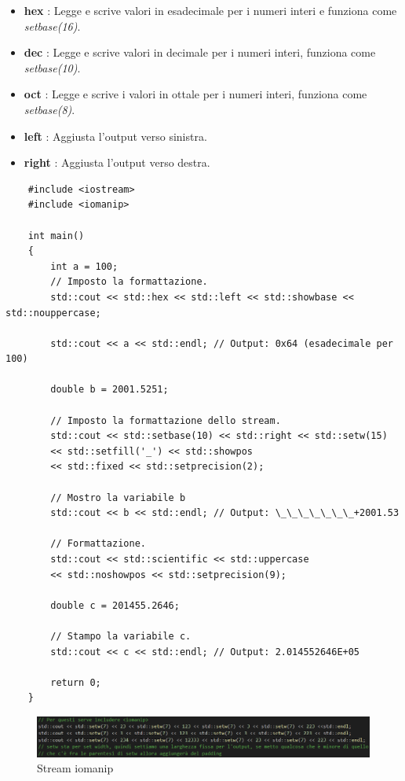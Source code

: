 \begin{enumerate}
\begin{itemize}
			\item \textsf{\small \textbf{hex} : Legge e scrive valori in esadecimale per i numeri interi e funziona come \emph{setbase(16)}.}
			\item \textsf{\small \textbf{dec} : Legge e scrive valori in decimale per i numeri interi, funziona come \emph{setbase(10)}.}
			\item \textsf{\small \textbf{oct} : Legge e scrive i valori in ottale per i numeri interi, funziona come \emph{setbase(8)}.}
			\item \textsf{\small \textbf{left} : Aggiusta l'output verso sinistra.}
			\item \textsf{\small \textbf{right} : Aggiusta l'output verso destra.}
		\end{itemize}
\end{enumerate}

\begin{lstlisting}
	#include <iostream>
	#include <iomanip>
	
	int main()
	{
		int a = 100;
		// Imposto la formattazione.
		std::cout << std::hex << std::left << std::showbase << std::nouppercase;
		
		std::cout << a << std::endl; // Output: 0x64 (esadecimale per 100)
		
		double b = 2001.5251;
		
		// Imposto la formattazione dello stream.
		std::cout << std::setbase(10) << std::right << std::setw(15)
		<< std::setfill('_') << std::showpos
		<< std::fixed << std::setprecision(2);
		
		// Mostro la variabile b
		std::cout << b << std::endl; // Output: \_\_\_\_\_\_\_+2001.53
		
		// Formattazione.
		std::cout << std::scientific << std::uppercase
		<< std::noshowpos << std::setprecision(9);
		
		double c = 201455.2646;
		
		// Stampo la variabile c.
		std::cout << c << std::endl; // Output: 2.014552646E+05
		
		return 0;
	}
\end{lstlisting}

\begin{figure}[ht]
	\centering
	\includegraphics[width=1\textwidth, height=1\textheight, keepaspectratio]{./imgs/Stream_iomanip_setw.png}
	\caption{Stream iomanip}
	\label{fig:Stream_iomanip_setw}
\end{figure}

